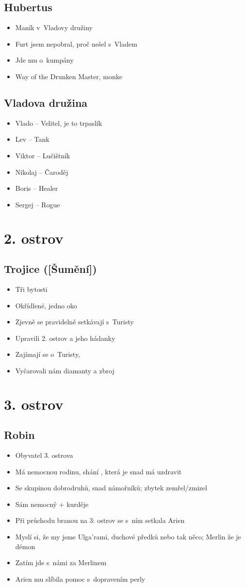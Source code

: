 \documentclass[a4paper,twocolumn,openany,nodeprecatedcode, justified]{dndbook}
\newcommand{\bi}{\begin{itemize}}
\newcommand{\ei}{\end{itemize}}
\begin{document}
	\subsection{Hubertus}
	\bi
		\item Maník v~Vladovy družiny
		\item Furt jsem nepobral, proč nešel s~Vladem
		\item Jde mu o~kumpány
		\item Way of the Drunken Master, monke
	\ei
	
	\subsection{Vladova družina}
	\bi
		\item Vlado -- Velitel, je to trpaslík
		\item Lev -- Tank
		\item Viktor -- Lučištník
		\item Nikolaj -- Čaroděj
		\item Boris -- Healer
		\item Sergej -- Rogue
	\ei
	
	\section{2. ostrov}
	\subsection{Trojice ([Šumění])}
	\bi
		\item Tři bytosti
		\item Okřídlené, jedno oko
		\item Zjevně se pravidelně setkávají s~Turisty
		\item Upravili 2. ostrov a jeho hádanky
		\item Zajímají se o~Turisty, 
		\item Vyčarovali nám diamanty a zbroj
	\ei
	
	\section{3. ostrov}
	\subsection{Robin}
	\bi
		\item Obyvatel 3. ostrova
		\item Má nemocnou rodinu, shání , která je snad má uzdravit
		\item Se skupinou dobrodruhů, snad námořníků; zbytek zemřel/zmizel
		\item Sám nemocný + kurděje
		\item Při průchodu branou na 3: ostrov se s~ním setkala Arien
		\item Myslí si, že my jsme Ulga'rami, duchové předků nebo tak něco; Merlin že je démon
		\item Zatím jde s~námi za Merlinem
		\item Arien mu slíbila pomoc s~dopravením perly
	\ei
	
	
	
\end{document}
